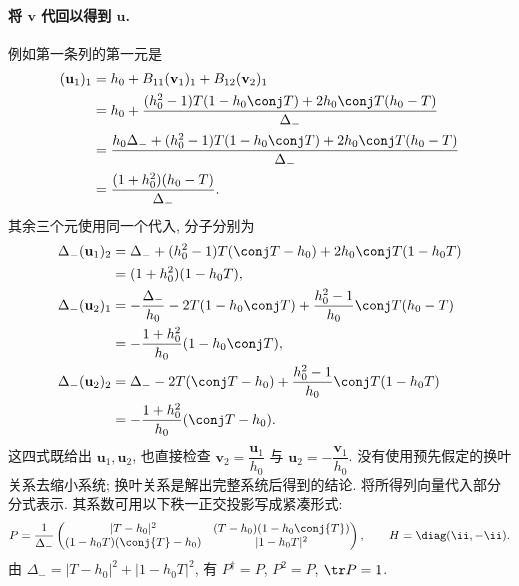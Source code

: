 \paragraph{将 $\boldsymbol v$ 代回以得到 $\boldsymbol u$.}
例如第一条列的第一元是
\[
\begin{aligned}
(\mathbf u_1)_1
&=h_0+ B_{11}(\mathbf v_1)_1
+ B_{12}(\mathbf v_2)_1\\
&=h_0+\dfrac{(h_0^2-1)T(1-h_0\conj T)
+2h_0\conj T(h_0-T)}{\Delta_-}\\
&=\dfrac{h_0\Delta_-+(h_0^2-1)T(1-h_0\conj T)
+2h_0\conj T(h_0-T)}{\Delta_-}\\
&=\dfrac{(1+h_0^2)(h_0-T)}{\Delta_-}.
\end{aligned}
\]
其余三个元使用同一个代入, 分子分别为
\[
\begin{aligned}
\Delta_-(\mathbf u_1)_2
&=\Delta_-+(h_0^2-1)T(\conj T-h_0)
+2h_0\conj T(1-h_0T)\\
&=(1+h_0^2)(1-h_0T),\\
\Delta_-(\mathbf u_2)_1
&=-\dfrac{\Delta_-}{h_0}-2T(1-h_0\conj T)
+\dfrac{h_0^2-1}{h_0}\conj T(h_0-T)\\
&=-\dfrac{1+h_0^2}{h_0}(1-h_0\conj T),\\
\Delta_-(\mathbf u_2)_2
&=\Delta_--2T(\conj T-h_0)
+\dfrac{h_0^2-1}{h_0}\conj T(1-h_0T)\\
&=-\dfrac{1+h_0^2}{h_0}(\conj T-h_0).
\end{aligned}
\]
这四式既给出 $\mathbf u_1,\mathbf u_2$, 也直接检查
$\mathbf v_2=\dfrac{\mathbf u_1}{h_0}$ 与 $\mathbf u_2=-\dfrac{\mathbf v_1}{h_0}$.
没有使用预先假定的换叶关系去缩小系统;
换叶关系是解出完整系统后得到的结论.
将所得列向量代入部分分式表示. 其系数可用以下秩一正交投影写成紧凑形式:
\begin{equation}\label{eq:algebraic-P}
P=\dfrac{1}{\Delta_-}
\begin{pmatrix}
|T-h_0|^2&(T-h_0)(1-h_0\conj{T})\\
(1-h_0T)(\conj{T}-h_0)&|1-h_0T|^2
\end{pmatrix},\qquad H=\diag(\ii,-\ii).
\end{equation}
由 $\Delta_-=|T-h_0|^2+|1-h_0T|^2$, 有 $P^\dagger=P$, $P^2=P$, $\tr P=1$.

